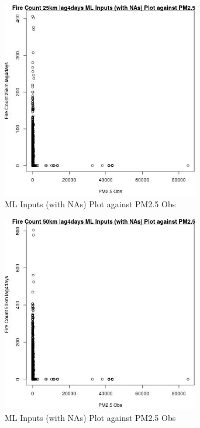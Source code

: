 \begin{figure} 
\centering  
\includegraphics[width=0.77\textwidth]{Code_Outputs/Report_ML_input_PM25_Step4_part_f_de_duplicated_aveswNAs_Fire_Count_25km_lag4daysvPM25_Obs.jpg} 
\caption{\label{fig:Report_ML_input_PM25_Step4_part_f_de_duplicated_aveswNAsFire_Count_25km_lag4daysvPM25_Obs}ML Inputs (with NAs) Plot against PM2.5 Obs} 
\end{figure} 
 

\begin{figure} 
\centering  
\includegraphics[width=0.77\textwidth]{Code_Outputs/Report_ML_input_PM25_Step4_part_f_de_duplicated_aveswNAs_Fire_Count_50km_lag4daysvPM25_Obs.jpg} 
\caption{\label{fig:Report_ML_input_PM25_Step4_part_f_de_duplicated_aveswNAsFire_Count_50km_lag4daysvPM25_Obs}ML Inputs (with NAs) Plot against PM2.5 Obs} 
\end{figure} 
 

